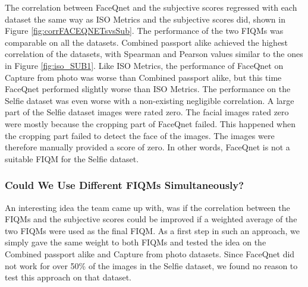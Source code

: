\noindent
The correlation between FaceQnet and the subjective scores regressed with each dataset the same way as ISO Metrics and the subjective scores did, shown in Figure \ref{fig:corrFACEQNETsvsSub}. The performance of the two FIQMs was comparable on all the datasets. Combined passport alike achieved the highest correlation of the datasets, with Spearman and Pearson values similar to the ones in Figure \ref{fig:iso_SUB1}. Like ISO Metrics, the performance of FaceQnet on Capture from photo was worse than Combined passport alike, but this time FaceQnet performed slightly worse than ISO Metrics. The performance on the Selfie dataset was even worse with a non-existing negligible correlation. A large part of the Selfie dataset images were rated zero. The facial images rated zero were mostly because the cropping part of FaceQnet failed. This happened when the cropping part failed to detect the face of the images. The images were therefore manually provided a score of zero. In other words, FaceQnet is not a suitable FIQM for the Selfie dataset. 

\subsubsection{Could We Use Different FIQMs Simultaneously?}
An interesting idea the team came up with, was if the correlation between the FIQMs and the subjective scores could be improved if a weighted average of the two FIQMs were used as the final FIQM. As a first step in such an approach, we simply gave the same weight to both FIQMs and tested the idea on the Combined passport alike and Capture from photo datasets. Since FaceQnet did not work for over 50\% of the images in the Selfie dataset, we found no reason to test this approach on that dataset. 

